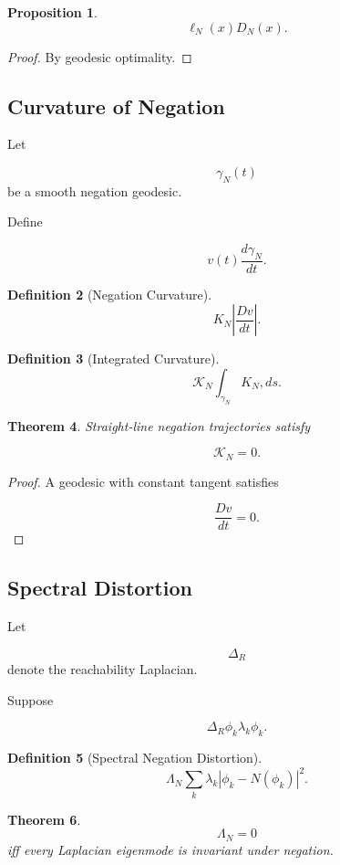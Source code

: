 \documentclass[12pt]{article}
\newtheorem{theorem}{Theorem}[section]
\newtheorem{proposition}[theorem]{Proposition}
\newtheorem{definition}[theorem]{Definition}
\theoremstyle{remark}
\begin{document}
\begin{proposition}
\[
\ell_N(x)
D_N(x).
\]
\end{proposition}

\begin{proof}
By geodesic optimality.
\end{proof}

\subsection{Curvature of Negation}

Let

\[
\gamma_N(t)
\]
be a smooth negation geodesic.

Define

\[
v(t)
\frac{d\gamma_N}{dt}.
\]

\begin{definition}[Negation Curvature]
\[
K_N
\left|
\frac{Dv}{dt}
\right|.
\]
\end{definition}

\begin{definition}[Integrated Curvature]
\[
\mathcal K_N
\int_{\gamma_N}
K_N,ds.
\]
\end{definition}

\begin{theorem}
Straight-line negation trajectories satisfy

\[
\mathcal K_N=0.
\]
\end{theorem}
\begin{proof}
A geodesic with constant tangent satisfies

\[
\frac{Dv}{dt}=0.
\]
\end{proof}
\subsection{Spectral Distortion}

Let

\[
\Delta_R
\]
denote the reachability Laplacian.

Suppose

\[
\Delta_R \phi_k
\lambda_k \phi_k.
\]

\begin{definition}[Spectral Negation Distortion]
\[
\Lambda_N
\sum_k
\lambda_k
|
\phi_k-N(\phi_k)
|^2.
\]
\end{definition}

\begin{theorem}
\[
\Lambda_N=0
\]
iff every Laplacian eigenmode is invariant under negation.
\end{theorem}
\end{document}

